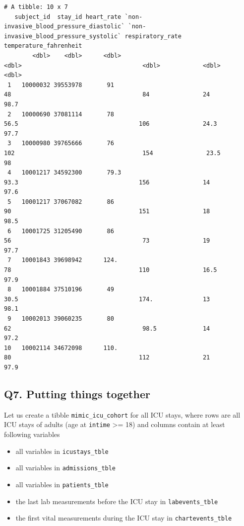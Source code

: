 \documentclass[
]{article}
\providecommand{\tightlist}{%
  \setlength{\itemsep}{0pt}\setlength{\parskip}{0pt}}\usepackage{longtable,booktabs,array}
\begin{document}
\begin{verbatim}
# A tibble: 10 x 7
   subject_id  stay_id heart_rate `non-invasive_blood_pressure_diastolic` `non-invasive_blood_pressure_systolic` respiratory_rate temperature_fahrenheit
        <dbl>    <dbl>      <dbl>                                   <dbl>                                  <dbl>            <dbl>                  <dbl>
 1   10000032 39553978       91                                      48                                     84               24                     98.7
 2   10000690 37081114       78                                      56.5                                  106               24.3                   97.7
 3   10000980 39765666       76                                     102                                    154               23.5                   98  
 4   10001217 34592300       79.3                                    93.3                                  156               14                     97.6
 5   10001217 37067082       86                                      90                                    151               18                     98.5
 6   10001725 31205490       86                                      56                                     73               19                     97.7
 7   10001843 39698942      124.                                     78                                    110               16.5                   97.9
 8   10001884 37510196       49                                      30.5                                  174.              13                     98.1
 9   10002013 39060235       80                                      62                                     98.5             14                     97.2
10   10002114 34672098      110.                                     80                                    112               21                     97.9
\end{verbatim}

\hypertarget{q7.-putting-things-together}{%
\subsection{Q7. Putting things
together}\label{q7.-putting-things-together}}

Let us create a tibble \texttt{mimic\_icu\_cohort} for all ICU stays,
where rows are all ICU stays of adults (age at \texttt{intime}
\textgreater= 18) and columns contain at least following variables

\begin{itemize}
\tightlist
\item
  all variables in \texttt{icustays\_tble}\\
\item
  all variables in \texttt{admissions\_tble}\\
\item
  all variables in \texttt{patients\_tble}
\item
  the last lab measurements before the ICU stay in
  \texttt{labevents\_tble}
\item
  the first vital measurements during the ICU stay in
  \texttt{chartevents\_tble}
\end{itemize}
\end{document}
